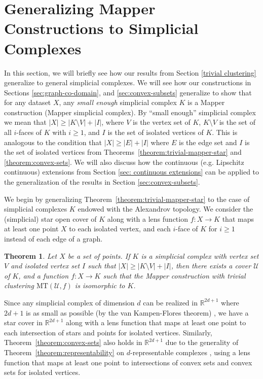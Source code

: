 \documentclass[reqno,oneside,11pt]{amsart}
\newtheorem{theorem}{Theorem}[section]
\theoremstyle{definition}
\theoremstyle{remark}
\newcommand{\MT}{\text{MT}}
\begin{document}
\section{Generalizing Mapper Constructions to Simplicial Complexes}
\label{sec:generaliziation}

In this section, we will briefly see how our results from Section \ref{trivial clustering} generalize to general simplicial complexes.
We will see how our constructions in Sections \ref{sec:graph-co-domain}, and \ref{sec:convex-subsets} generalize to show that for any dataset $X$, any {\it small enough} simplicial complex $K$ is a Mapper construction (Mapper simplicial complex). 
By ``small enough'' simplicial complex we mean that $|X| \geq |K\setminus V|+|I|$, where $V$ is the vertex set of $K$, $K\setminus V$ is the set of all $i$-faces of $K$ with $i \geq 1$, and $I$ is the set of isolated vertices of $K$.
This is analogous to the condition that $|X| \geq |E|+|I|$ where $E$ is the edge set and $I$ is the set of isolated vertices from Theorems~\ref{theorem:trivial-mapper-star} and \ref{theorem:convex-sets}.
We will also discuss how the continuous (e.g. Lipschitz continuous) extensions from Section \ref{sec: continuous extensions} can be applied to the generalization of the results in Section \ref{sec:convex-subsets}.

We begin by generalizing Theorem~\ref{theorem:trivial-mapper-star} to the case of simplicial complexes $K$ endowed with the Alexandrov topology. 
We consider the (simplicial) star open cover of $K$ along with a lens function $f\colon X \to K$ that maps at least one point $X$ to each isolated vertex, and each $i$-face of $K$ for $i\geq 1$ instead of each edge of a graph.

\begin{theorem} 
\label{theorem:trivial-mapper-construction-star}
Let $X$ be a set of points. 
If $K$ is a simplicial complex with vertex set $V$ and isolated vertex set $I$ such that $|X| \geq |K\setminus V|+|I|$, then there exists a cover $\mathcal{U}$ of $K$, and a function $f\colon X\to K$ such that the Mapper construction with trivial clustering $\MT(\mathcal{U}, f)$ is isomorphic to $K$.
\end{theorem}

Since any simplicial complex of dimension $d$ can be realized in $\mathbb{R}^{2d+1}$ where $2d+1$ is as small as possible (by the van Kampen-Flores theorem) \cite{van1933komplexe,flores1933n},
we have a star cover in $\mathbb{R}^{2d+1}$ along with a lens function that maps at least one point to each intersection of stars and points for isolated vertices. Similarly, Theorem~\ref{theorem:convex-sets} also holds in $\mathbb{R}^{2d+1}$ due to the generality of  Theorem~\ref{theorem:representability} on $d$-representable complexes \cite{wegner1967eigenschaften,tancer2011representability}, using a lens function that maps at least one point to  intersections of convex sets and convex sets for isolated vertices.
\end{document}
